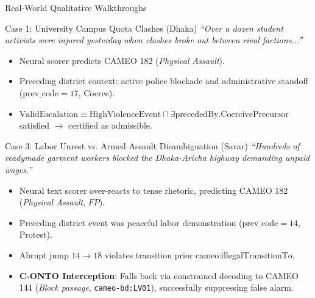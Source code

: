 \documentclass[aspectratio=169, 10pt]{beamer}
\begin{document}
\begin{frame}{Real-World Qualitative Walkthroughs}
  \small
  \begin{block}{Case 1: University Campus Quota Clashes (Dhaka)}
    \textit{``Over a dozen student activists were injured yesterday when clashes broke out between rival factions...''}
    \begin{itemize}
      \item Neural scorer predicts CAMEO 182 (\textit{Physical Assault}).
      \item Preceding district context: active police blockade and administrative standoff ($\text{prev\_code} = 17$, Coerce).
      \item $\text{ValidEscalation} \equiv \text{HighViolenceEvent} \sqcap \exists \text{precededBy}.\text{CoercivePrecursor}$ satisfied $\to$ certified as admissible.
    \end{itemize}
  \end{block}
  \vspace{0.4em}
  \begin{block}{Case 3: Labor Unrest vs. Armed Assault Disambiguation (Savar)}
    \textit{``Hundreds of readymade garment workers blocked the Dhaka-Aricha highway demanding unpaid wages.''}
    \begin{itemize}
      \item Neural text scorer over-reacts to tense rhetoric, predicting CAMEO 182 (\textit{Physical Assault}, $FP$).
      \item Preceding district event was peaceful labor demonstration ($\text{prev\_code} = 14$, Protest).
      \item Abrupt jump $14 \to 18$ violates transition prior $\text{cameo:illegalTransitionTo}$.
      \item \textbf{C-ONTO Interception}: Falls back via constrained decoding to CAMEO 144 (\textit{Block passage}, \texttt{cameo-bd:LV01}), successfully suppressing false alarm.
    \end{itemize}
  \end{block}
\end{frame}
\end{document}

